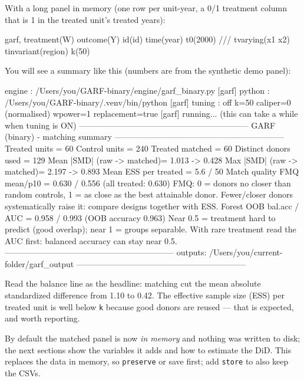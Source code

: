 \documentclass[11pt,a4paper]{article}
\newcommand{\code}[1]{\texttt{#1}}
\begin{document}
With a long panel in memory (one row per unit-year, a 0/1 treatment column that is 1 in the
treated unit's treated years):
\begin{stata}
garf, treatment(W) outcome(Y) id(id) time(year) t0(2000) ///
      tvarying(x1 x2) tinvariant(region) k(50)
\end{stata}
You will see a summary like this (numbers are from the synthetic demo panel):
\begin{console}
[garf] engine : /Users/you/GARF-binary/engine/garf_binary.py
[garf] python : /Users/you/GARF-binary/.venv/bin/python
[garf] tuning : off   k=50   caliper=0 (normalised)   wpower=1   replacement=true
[garf] running... (this can take a while when tuning is ON)
--------------------------------------------------------------
GARF (binary) - matching summary
--------------------------------------------------------------
Treated units              =        60
Control units              =       240
Treated matched            =        60
Distinct donors used       =       129
Mean |SMD| (raw -> matched)= 1.013  ->  0.428
Max  |SMD| (raw -> matched)= 2.197  ->  0.893
Mean ESS per treated       =   5.6 / 50
Match quality FMQ mean/p10 = 0.630 / 0.556   (all treated: 0.630)
  FMQ: 0 = donors no closer than random controls, 1 = as close as the best attainable donor.
  Fewer/closer donors systematically raise it: compare designs together with ESS.
Forest OOB bal.acc / AUC   = 0.958 / 0.993   (OOB accuracy 0.963)
  Near 0.5 = treatment hard to predict (good overlap); near 1 = groups separable.
  With rare treatment read the AUC first: balanced accuracy can stay near 0.5.
--------------------------------------------------------------
outputs: /Users/you/current-folder/garf_output
--------------------------------------------------------------
\end{console}
Read the balance line as the headline: matching cut the mean absolute standardized
difference from 1.10 to 0.42. The effective sample size (ESS) per treated unit is well below
\code{k} because good donors are reused --- that is expected, and worth reporting.

By default the matched panel is now \emph{in memory} and nothing was written to disk; the next
sections show the variables it adds and how to estimate the DiD. This replaces the data in
memory, so \code{preserve} or save first; add \code{store} to also keep the CSVs.
\end{document}
